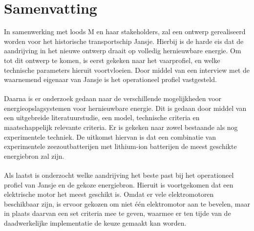 \chapter*{Samenvatting}

In samenwerking met loods M en haar stakeholders, zal een ontwerp gerealiseerd worden voor het historische transportschip Jansje. Hierbij is de harde eis dat de aandrijving in het nieuwe ontwerp draait op volledig hernieuwbare energie. Om tot dit ontwerp te komen, is eerst gekeken naar het vaarprofiel, en welke technische parameters hieruit voortvloeien. Door middel van een interview met de waarnemend eigenaar van Jansje is het operationeel profiel vastgesteld. 
\\\\
Daarna is er onderzoek gedaan naar de verschillende mogelijkheden voor energieopslagsystemen voor hernieuwbare energie. Dit is gedaan door middel van een uitgebreide literatuurstudie, een model, technische criteria en maatschappelijk relevante criteria. Er is gekeken naar zowel bestaande als nog experimentele techniek. De uitkomst hiervan is dat een combinatie van experimentele zeezoutbatterijen met lithium-ion batterijen de meest geschikte energiebron zal zijn. 
\\\\
Als laatst is onderzocht welke aandrijving het beste past bij het operationeel profiel van Jansje en de gekoze energiebron. Hieruit is voortgekomen dat een elektrische motor het meest geschikt is. Omdat er vele elektromotoren beschikbaar zijn, is ervoor gekozen om niet één elektromotor aan te bevelen, maar in plaats daarvan een set criteria mee te geven, waarmee er ten tijde van de daadwerkelijke implementatie de keuze gemaakt kan worden.



